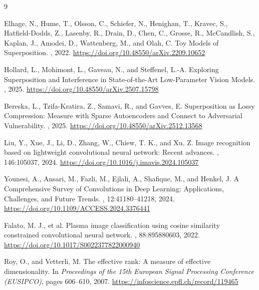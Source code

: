 \documentclass[12pt,a4paper]{report}
\begin{document}


\begin{thebibliography}{9}

Elhage, N., Hume, T., Olsson, C., Schiefer, N., Henighan, T., Kravec, S., Hatfield-Dodds, Z., Lasenby, R., Drain, D., Chen, C., Grosse, R., McCandlish, S., Kaplan, J., Amodei, D., Wattenberg, M., and Olah, C.
\newblock Toy Models of Superposition.
, 2022.
\newblock \url{https://doi.org/10.48550/arXiv.2209.10652}

Hollard, L., Mohimont, L., Gaveau, N., and Steffenel, L.-A.
\newblock Exploring Superposition and Interference in State-of-the-Art Low-Parameter Vision Models.
, 2025.
\newblock \url{https://doi.org/10.48550/arXiv.2507.15798}

Bereska, L., Tzifa-Kratira, Z., Samavi, R., and Gavves, E.
\newblock Superposition as Lossy Compression: Measure with Sparse Autoencoders and Connect to Adversarial Vulnerability.
, 2025.
\newblock \url{https://doi.org/10.48550/arXiv.2512.13568}

Liu, Y., Xue, J., Li, D., Zhang, W., Chiew, T. K., and Xu, Z.
\newblock Image recognition based on lightweight convolutional neural network: Recent advances.
, 146:105037, 2024.
\newblock \url{https://doi.org/10.1016/j.imavis.2024.105037}

Younesi, A., Ansari, M., Fazli, M., Ejlali, A., Shafique, M., and Henkel, J.
\newblock A Comprehensive Survey of Convolutions in Deep Learning: Applications, Challenges, and Future Trends.
, 12:41180--41218, 2024.
\newblock \url{https://doi.org/10.1109/ACCESS.2024.3376441}

Falato, M. J., et al.
\newblock Plasma image classification using cosine similarity constrained convolutional neural network.
, 88:895880603, 2022.
\newblock \url{https://doi.org/10.1017/S0022377822000940}

Roy, O., and Vetterli, M.
\newblock The effective rank: A measure of effective dimensionality.
\newblock In {\em Proceedings of the 15th European Signal Processing Conference (EUSIPCO)}, pages 606--610, 2007.
\newblock \url{https://infoscience.epfl.ch/record/119465}

\end{thebibliography}
\end{document}
